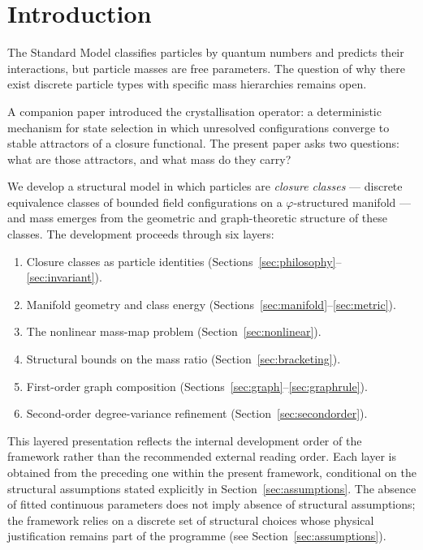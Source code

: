 \documentclass[12pt]{article}
\newcommand{\phig}{\varphi}
\begin{document}
\section{Introduction}\label{sec:intro}

The Standard Model classifies particles by quantum numbers and predicts their interactions, but particle masses are free parameters. The question of why there exist discrete particle types with specific mass hierarchies remains open.

A companion paper \citep{Smart2026} introduced the crystallisation operator: a deterministic mechanism for state selection in which unresolved configurations converge to stable attractors of a closure functional. The present paper asks two questions: what are those attractors, and what mass do they carry?

We develop a structural model in which particles are \textit{closure classes} --- discrete equivalence classes of bounded field configurations on a $\phig$-structured manifold --- and mass emerges from the geometric and graph-theoretic structure of these classes. The development proceeds through six layers:

\begin{enumerate}
    \item Closure classes as particle identities (Sections~\ref{sec:philosophy}--\ref{sec:invariant}).
    \item Manifold geometry and class energy (Sections~\ref{sec:manifold}--\ref{sec:metric}).
    \item The nonlinear mass-map problem (Section~\ref{sec:nonlinear}).
    \item Structural bounds on the mass ratio (Section~\ref{sec:bracketing}).
    \item First-order graph composition (Sections~\ref{sec:graph}--\ref{sec:graphrule}).
    \item Second-order degree-variance refinement (Section~\ref{sec:secondorder}).
\end{enumerate}

This layered presentation reflects the internal development order of the framework rather than the recommended external reading order. Each layer is obtained from the preceding one within the present framework, conditional on the structural assumptions stated explicitly in Section~\ref{sec:assumptions}. The absence of fitted continuous parameters does not imply absence of structural assumptions; the framework relies on a discrete set of structural choices whose physical justification remains part of the programme (see Section~\ref{sec:assumptions}).
\end{document}
